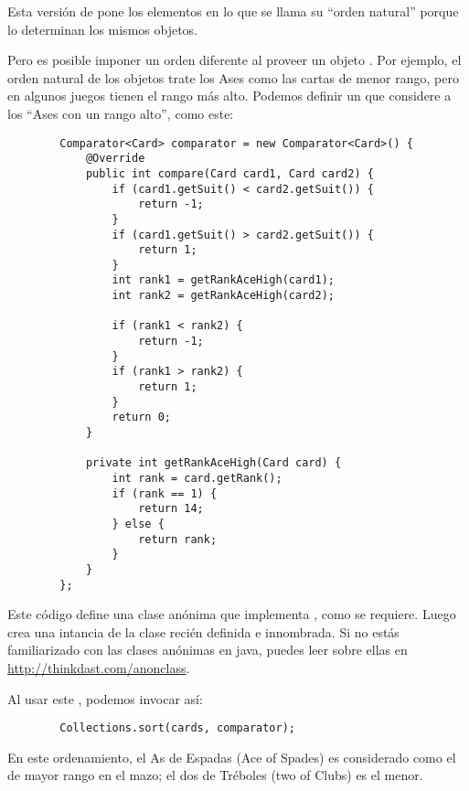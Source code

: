 \documentclass[12pt]{book}
\theoremstyle{exercise}
\begin{document}
Esta versión de  pone los elementos en lo que se llama su
``orden natural'' porque lo determinan los mismos objetos.


Pero es posible imponer un orden diferente al proveer un objeto
. Por ejemplo, el orden natural de los objetos
 trate los Ases como las cartas de menor rango, pero en algunos
juegos tienen el rango más alto. Podemos definir un 
que considere a los ``Ases con un rango alto'', como este:

\begin{verbatim}
        Comparator<Card> comparator = new Comparator<Card>() {
            @Override
            public int compare(Card card1, Card card2) {
                if (card1.getSuit() < card2.getSuit()) {
                    return -1;
                }
                if (card1.getSuit() > card2.getSuit()) {
                    return 1;
                }
                int rank1 = getRankAceHigh(card1);
                int rank2 = getRankAceHigh(card2);

                if (rank1 < rank2) {
                    return -1;
                }
                if (rank1 > rank2) {
                    return 1;
                }
                return 0;
            }

            private int getRankAceHigh(Card card) {
                int rank = card.getRank();
                if (rank == 1) {
                    return 14;
                } else {
                    return rank;
                }
            }
        };
\end{verbatim}

Este código define una clase anónima que implementa ,
como se requiere. Luego crea una intancia de la clase recién definida
e innombrada. Si no estás familiarizado con las clases anónimas en
java, puedes leer sobre ellas en \url{http://thinkdast.com/anonclass}.


Al usar este , podemos invocar  así:

\begin{verbatim}
        Collections.sort(cards, comparator);
\end{verbatim}

En este ordenamiento, el As de Espadas (Ace of Spades) es considerado como
el de mayor rango en el mazo; el dos de Tréboles (two of Clubs) es el menor.
\end{document}
